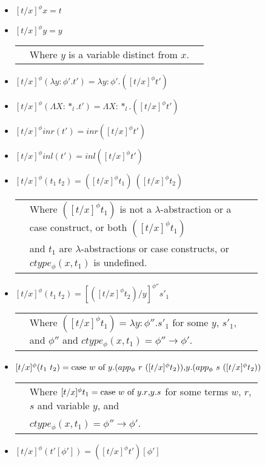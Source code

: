 \begin{figure}[t]
  \begin{itemize}
  \item[] $[t/x]^\phi x = t$
  \item[] $[t/x]^\phi y = y$\\
    \begin{tabular}{lll}
      & Where $y$ is a variable distinct from $x$.\\
    \end{tabular}
  \item[] $[t/x]^\phi (\lambda y:\phi'.t') = \lambda y:\phi'.([t/x]^\phi t')$
  \item[] $[t/x]^\phi (\Lambda X:*_l.t') = \Lambda X:*_l.([t/x]^\phi t')$
  \item[] $[t/x]^\phi inr(t') = inr([t/x]^\phi t')$
  \item[] $[t/x]^\phi inl(t') = inl([t/x]^\phi t')$
  \item[] $[t/x]^\phi (t_1\ t_2) = ([t/x]^\phi t_1)\ ([t/x]^\phi t_2)$\\
    \begin{tabular}{lll}
      & Where $([t/x]^\phi t_1)$ is not a $\lambda$-abstraction or a case construct, or both 
        $([t/x]^\phi t_1)$\\
      & and $t_1$ are $\lambda$-abstractions or case constructs, or $ctype_\phi(x,t_1)$ is 
        undefined.
    \end{tabular}
  \item[] $[t/x]^{\phi} (t_1\ t_2) = [([t/x]^{\phi} t_2)/y]^{\phi''} s'_1$\\
    \begin{tabular}{lll}
      & Where $([t/x]^{\phi} t_1) = \lambda y:\phi''.s'_1$ 
      for some $y$, $s'_1$, and $\phi''$ and $ctype_\phi(x,t_1) = \phi'' \to \phi'$.\\
    \end{tabular}
  \item[] $[t/x]^{\phi} (t_1\ t_2) = 
    \ccon{w}{y}{(app_\phi\ r\ ([t/x]^{\phi} t_2))}{(app_\phi\ s\ ([t/x]^{\phi} t_2))}$\\
    \begin{tabular}{ll}
      & Where $[t/x]^{\phi} t_1 = \mbox{case}\ w\ \text{of}\ y\text{.}r\text{,}y\text{.}s$ for some terms $w$, $r$, $s$ 
      and variable $y$, and \\
      & $ctype_\phi(x,t_1) = \phi'' \to \phi'$.
    \end{tabular}
  \item[] $[t/x]^\phi (t'[\phi']) = ([t/x]^\phi t')[\phi']$\\

\end{itemize}
\end{figure}
